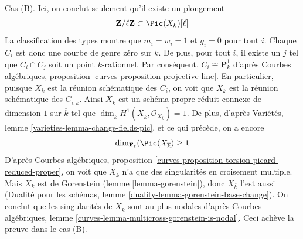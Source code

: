 \medskip\noindent
Cas (B). Ici, on conclut seulement qu'il existe un plongement
$$
\mathbf{Z}/\ell \mathbf{Z} \subset \Pic(X_k)[\ell]
$$
La classification des types montre que $m_i=w_i=1$ et $g_i=0$ pour tout
$i$. Chaque $C_i$ est donc une courbe de genre zéro sur $k$. De plus, pour
tout $i$, il existe un $j$ tel que $C_i\cap C_j$ soit un point
$k$-rationnel. Par conséquent, $C_i\cong\mathbf{P}^1_k$ d'après Courbes
algébriques, proposition \ref{curves-proposition-projective-line}.
En particulier, puisque $X_k$ est la réunion schématique des $C_i$, on voit
que $X_{\overline{k}}$ est la réunion schématique des
$C_{i,\overline{k}}$. Ainsi $X_{\overline{k}}$ est un schéma propre réduit
connexe de dimension $1$ sur $\overline{k}$ tel que
$\dim_{\overline{k}}H^1(X_{\overline{k}},
\mathcal{O}_{X_{\overline{k}}})=1$. De plus, d'après Variétés, lemme
\ref{varieties-lemma-change-fields-pic}, et ce qui précède, on a encore
$$
\dim_{\mathbf{F}_\ell}(\Pic(X_{\overline{k}}) \geq 1
$$
D'après Courbes algébriques, proposition
\ref{curves-proposition-torsion-picard-reduced-proper}, on voit que
$X_{\overline{k}}$ n'a que des singularités en croisement multiple.
Mais $X_k$ est de Gorenstein (lemme \ref{lemma-gorenstein}), donc
$X_{\overline{k}}$ l'est aussi (Dualité pour les schémas, lemme
\ref{duality-lemma-gorenstein-base-change}). On conclut que les singularités
de $X_{\overline{k}}$ sont au plus nodales d'après Courbes algébriques,
lemme \ref{curves-lemma-multicross-gorenstein-is-nodal}. Ceci achève la
preuve dans le cas (B).

